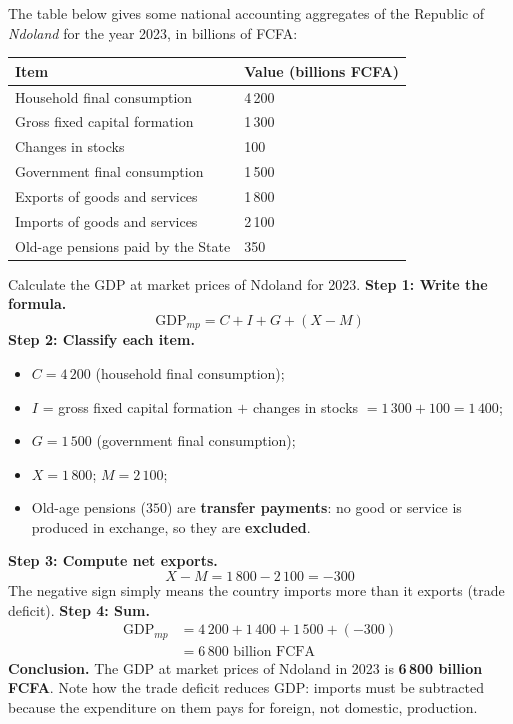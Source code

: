 \documentclass[11pt]{article}
\begin{document}
\begin{exoresolu}
The table below gives some national accounting aggregates of the Republic of \emph{Ndoland} for the year 2023, in billions of FCFA:
\begin{center}
\begin{tabularx}{\linewidth}{|l|X|}\hline
\rowcolor{popblueL} \textbf{Item} & \textbf{Value (billions FCFA)} \\ \hline
Household final consumption & 4\,200 \\ \hline
Gross fixed capital formation & 1\,300 \\ \hline
Changes in stocks & 100 \\ \hline
Government final consumption & 1\,500 \\ \hline
Exports of goods and services & 1\,800 \\ \hline
Imports of goods and services & 2\,100 \\ \hline
Old-age pensions paid by the State & 350 \\ \hline
\end{tabularx}
\end{center}
Calculate the GDP at market prices of Ndoland for 2023.
\tcblower
\textbf{Step 1: Write the formula.}
\[ \mathrm{GDP}_{mp} = C + I + G + (X - M) \]
\textbf{Step 2: Classify each item.}
\begin{itemize}
\item $C = 4\,200$ (household final consumption);
\item $I$ = gross fixed capital formation $+$ changes in stocks $= 1\,300 + 100 = 1\,400$;
\item $G = 1\,500$ (government final consumption);
\item $X = 1\,800$; $M = 2\,100$;
\item Old-age pensions ($350$) are \textbf{transfer payments}: no good or service is produced in exchange, so they are \textbf{excluded}.
\end{itemize}
\textbf{Step 3: Compute net exports.}
\[ X - M = 1\,800 - 2\,100 = -300 \]
The negative sign simply means the country imports more than it exports (trade deficit).
\textbf{Step 4: Sum.}
\begin{align*}
\mathrm{GDP}_{mp} &= 4\,200 + 1\,400 + 1\,500 + (-300)\\
&= 6\,800 \text{ billion FCFA}
\end{align*}
\textbf{Conclusion.} The GDP at market prices of Ndoland in 2023 is \textbf{6\,800 billion FCFA}. Note how the trade deficit reduces GDP: imports must be subtracted because the expenditure on them pays for foreign, not domestic, production.
\end{exoresolu}
\end{document}
